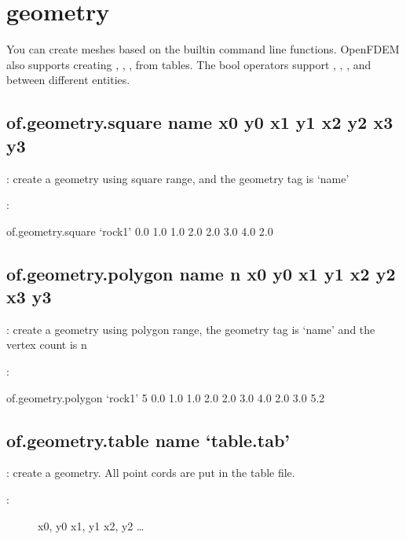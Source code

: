 \documentclass[letterpaper,10pt,english]{sphinxmanual}
\begin{document}
\chapter{geometry}
\label{\detokenize{rst_tutorials/command_line_guide:geometry}}
You can create meshes based on the built\sphinxhyphen{}in command line functions. OpenFDEM also supports creating , , ,
 from tables.  The bool operators support , , , and  between different entities.


\section{of.geometry.square name x0 y0 x1 y1 x2 y2 x3 y3}
\label{\detokenize{rst_tutorials/command_line_guide:of-geometry-square-name-x0-y0-x1-y1-x2-y2-x3-y3}}
: create a geometry using square range, and the geometry tag
is ‘name’

:

\begin{sphinxVerbatim}[commandchars=\\\{\}]
of.geometry.square ‘rock1’ 0.0 1.0 1.0 2.0 2.0 3.0 4.0 2.0
\end{sphinxVerbatim}


\section{of.geometry.polygon name n x0 y0 x1 y1 x2 y2 x3 y3}
\label{\detokenize{rst_tutorials/command_line_guide:of-geometry-polygon-name-n-x0-y0-x1-y1-x2-y2-x3-y3}}
: create a geometry using polygon range, the geometry tag is
‘name’ and the vertex count is n

:

\begin{sphinxVerbatim}[commandchars=\\\{\}]
of.geometry.polygon ‘rock1’ 5 0.0 1.0 1.0 2.0 2.0 3.0 4.0 2.0 3.0 5.2
\end{sphinxVerbatim}


\section{of.geometry.table name ‘table.tab’}
\label{\detokenize{rst_tutorials/command_line_guide:of-geometry-table-name-table-tab}}
: create a geometry. All point cords are put in the
table file.
\begin{description}
\item[{:}] \leavevmode
x0, y0
x1, y1
x2, y2
…

\end{description}
\end{document}
